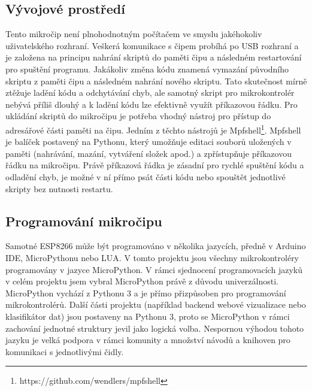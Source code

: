 \subsection*{Vývojové prostředí}
Tento mikročip není plnohodnotným počítačem ve smyslu jakéhokoliv uživatelského rozhraní. Veškerá komunikace s čipem probíhá po USB rozhraní a je založena na principu nahrání skriptů do paměti čipu a následném restartování pro spuštění programu. Jakákoliv změna kódu znamená vymazání původního skriptu z paměti čipu a následném nahrání nového skriptu. Tato skutečnost mírně ztěžuje ladění kódu a odchytávání chyb, ale samotný skript pro mikrokontrolér nebývá příliš dlouhý a k ladění kódu lze efektivně využít příkazovou řádku. Pro ukládání skriptů do mikročipu je potřeba vhodný nástroj pro přístup do adresářové části paměti na čipu. Jedním z těchto nástrojů je Mpfshell\footnote{https://github.com/wendlers/mpfshell}. Mpfshell je balíček postavený na Pythonu, který umožňuje editaci souborů uložených v paměti (nahrávání, mazání, vytváření složek apod.) a zpřístupňuje příkazovou řádku na mikročipu. Právě příkazová řádka je zásadní pro rychlé spuštění kódu a odladění chyb, je možné v ní přímo psát části kódu nebo spouštět jednotlivé skripty bez nutnosti restartu.

\subsection*{Programování mikročipu}
Samotné ESP8266 může být programováno v několika jazycích, předně v Arduino IDE, MicroPythonu nebo LUA. V tomto projektu jsou všechny mikrokontroléry programovány v jazyce MicroPython. V rámci sjednocení programovacích jazyků v celém projektu jsem vybral MicroPython právě z důvodu univerzálnosti. MicroPython vychází z Pythonu 3 a je přímo přizpůsoben pro programování mikrokontrolérů. Další části projektu (například backend webové vizualizace nebo klasifikátor dat) jsou postaveny na Pythonu 3, proto se MicroPython v rámci zachování jednotné struktury jevil jako logická volba. Nespornou výhodou tohoto jazyku je velká podpora v rámci komunity a množství návodů a knihoven pro komunikaci s jednotlivými čidly. 

